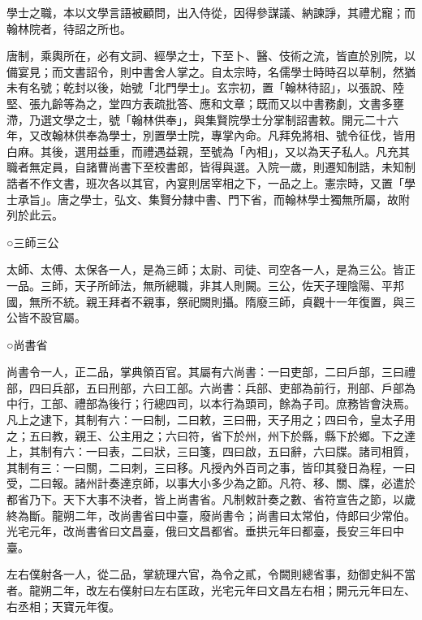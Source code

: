 \begin{pinyinscope}
 學士之職，本以文學言語被顧問，出入侍從，因得參謀議、納諫諍，其禮尤寵；而翰林院者，待詔之所也。



 唐制，乘輿所在，必有文詞、經學之士，下至卜、醫、伎術之流，皆直於別院，以備宴見；而文書詔令，則中書舍人掌之。自太宗時，名儒學士時時召以草制，然猶未有名號；乾封以後，始號「北門學士」。玄宗初，置「翰林待詔」，以張說、陸堅、張九齡等為之，堂四方表疏批答、應和文章；既而又以中書務劇，文書多壅滯，乃選文學之士，號「翰林供奉」，與集賢院學士分掌制詔書敕。開元二十六年，又改翰林供奉為學士，別置學士院，專掌內命。凡拜免將相、號令征伐，皆用白麻。其後，選用益重，而禮遇益親，至號為「內相」，又以為天子私人。凡充其職者無定員，自諸曹尚書下至校書郎，皆得與選。入院一歲，則遷知制誥，未知制誥者不作文書，班次各以其官，內宴則居宰相之下，一品之上。憲宗時，又置「學士承旨」。唐之學士，弘文、集賢分隸中書、門下省，而翰林學士獨無所屬，故附列於此云。



 ○三師三公



 太師、太傅、太保各一人，是為三師；太尉、司徒、司空各一人，是為三公。皆正一品。三師，天子所師法，無所總職，非其人則闕。三公，佐天子理陰陽、平邦國，無所不統。親王拜者不親事，祭祀闕則攝。隋廢三師，貞觀十一年復置，與三公皆不設官屬。



 ○尚書省



 尚書令一人，正二品，掌典領百官。其屬有六尚書：一曰吏部，二曰戶部，三曰禮部，四曰兵部，五曰刑部，六曰工部。六尚書：兵部、吏部為前行，刑部、戶部為中行，工部、禮部為後行；行總四司，以本行為頭司，餘為子司。庶務皆會決焉。凡上之逮下，其制有六：一曰制，二曰敕，三曰冊，天子用之；四曰令，皇太子用之；五曰教，親王、公主用之；六曰符，省下於州，州下於縣，縣下於鄉。下之達上，其制有六：一曰表，二曰狀，三曰箋，四曰啟，五曰辭，六曰牒。諸司相質，其制有三：一曰關，二曰刺，三曰移。凡授內外百司之事，皆印其發日為程，一曰受，二曰報。諸州計奏達京師，以事大小多少為之節。凡符、移、關、牒，必遣於都省乃下。天下大事不決者，皆上尚書省。凡制敕計奏之數、省符宣告之節，以歲終為斷。龍朔二年，改尚書省曰中臺，廢尚書令；尚書曰太常伯，侍郎曰少常伯。光宅元年，改尚書省曰文昌臺，俄曰文昌都省。垂拱元年曰都臺，長安三年曰中臺。



 左右僕射各一人，從二品，掌統理六官，為令之貳，令闕則總省事，劾御史糾不當者。龍朔二年，改左右僕射曰左右匡政，光宅元年曰文昌左右相；開元元年曰左、右丞相；天寶元年復。




\end{pinyinscope}
